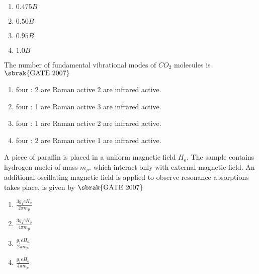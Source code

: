 \begin{multicols}{4}
\begin{enumerate}
    \item $0.475B$
    \item $0.50 B$
    \item $0.95 B$
    \item $1.0 B$
    
\end{enumerate}
\end{multicols}
\item The number of fundamental vibrational modes of $CO_2$ molecules is \hfill{$\sbrak{\text{GATE 2007}}$} 
\begin{enumerate}
    \item four : 2 are Raman active 2 are infrared active.
     \item four : 1 are Raman active 3 are infrared active.
      \item four : 1 are Raman active 2 are infrared active.
       \item four : 2 are Raman active 1 are infrared active.
    
\end{enumerate}
\item A piece of paraffin is placed in a uniform magnetic field $H_o$. The sample contains hydrogen nuclei of mass $m_p$. which interact only with external magnetic field. An additional oscillating magnetic field is applied to observe resonance absorptions takes place, is given by \hfill{$\sbrak{\text{GATE 2007}}$} 
\begin{multicols}{4}
\begin{enumerate}
    \item $\frac{3g_1 eH_o}{2\pi m_p}$
    \item $\frac{3g_1 eH_o}{4\pi m_p}$
    \item $\frac{g_1 eH_o}{2\pi m_p}$
    \item $\frac{g_1 eH_o}{4\pi m_p}$
\end{enumerate}
\end{multicols}

